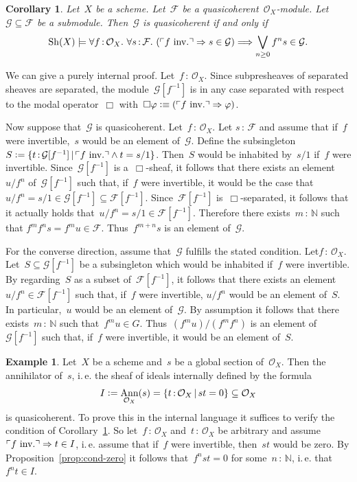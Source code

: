 \documentclass[10pt,reqno,a4paper]{amsbook}
\makeatletter
\theoremstyle{definition}
\newtheorem{ex}[defn]{Example}
\theoremstyle{plain}
\newtheorem{cor}[defn]{Corollary}
\theoremstyle{remark}
\newcommand{\F}{\mathcal{F}}
\renewcommand{\G}{\mathcal{G}}
\renewcommand{\O}{\mathcal{O}}
\newcommand{\NN}{\mathbb{N}}
\newcommand{\Sh}{\mathrm{Sh}}
\DeclareMathOperator{\Ann}{Ann}
\newcommand{\?}{\,{:}\,}
\renewcommand{\_}{\mathpunct{.}\,}
\newcommand{\speak}[1]{\ulcorner\text{\textnormal{#1}}\urcorner}
\newcommand{\ie}{i.\,e.\@\xspace}
\newcommand{\inv}{inv.\@}
\newcommand{\defeq}{\vcentcolon=}
\newcommand{\defequiv}{\vcentcolon\equiv}
\renewenvironment{proof}[1][\proofname]{\par
  \pushQED{\qed}%
  \normalfont \topsep6\p@\@plus6\p@\relax
  \trivlist
  \item[\hskip\labelsep
        \itshape
    #1\@addpunct{.}]\ignorespaces
}{%
  \popQED\endtrivlist\@endpefalse
}
\makeatother
\begin{document}
\begin{cor}\label{cor:submodule-qcoh}
Let~$X$ be a scheme. Let~$\F$ be a quasicoherent~$\O_X$-module.
Let~$\G \subseteq \F$ be a submodule. Then~$\G$ is quasicoherent if and only
if
\[ \Sh(X) \models \forall f\?\O_X\_
  \forall s\?\F\_
  (\speak{$f$ \inv} \Rightarrow s \in \G) \Longrightarrow
  \bigvee_{n \geq 0} f^n s \in \G. \]
\end{cor}
\begin{proof}We can give a purely internal proof. Let~$f\?\O_X$.
Since subpresheaves of separated sheaves are separated, the module~$\G[f^{-1}]$
is in any case separated with respect to the modal operator~$\Box$
with~$\Box\varphi \defequiv (\speak{$f$ \inv} \Rightarrow \varphi)$.

Now suppose that~$\G$ is quasicoherent. Let~$f\?\O_X$. Let $s\?\F$ and assume that
if~$f$ were invertible,~$s$ would be an element of~$\G$. Define the
subsingleton~$S \defeq \{ t\?\G[f^{-1}] \,|\, \speak{$f$ \inv} \wedge t=s/1 \}$.
Then~$S$ would be inhabited by~$s/1$ if~$f$ were invertible. Since~$\G[f^{-1}]$
is a~$\Box$-sheaf, it follows that there exists an element~$u/f^n$ of~$\G[f^{-1}]$
such that, if~$f$ were invertible, it would be the case that~$u/f^n = s/1 \in
\G[f^{-1}] \subseteq \F[f^{-1}]$.
Since~$\F[f^{-1}]$ is~$\Box$-separated, it follows that it actually holds that~$u/f^n
= s/1 \in \F[f^{-1}]$. Therefore there exists~$m\?\NN$ such that $f^m f^n s =
f^m u \in \F$. Thus~$f^{m+n} s$ is an element of~$\G$.

For the converse direction, assume that~$\G$ fulfills the stated condition.
Let$f\?\O_X$. Let~$S \subseteq \G[f^{-1}]$ be a subsingleton which would be
inhabited if~$f$ were invertible. By regarding~$S$ as a subset of~$\F[f^{-1}]$,
it follows that there exists an element~$u/f^n \in \F[f^{-1}]$ such that,
if~$f$ were invertible, $u/f^n$ would be an element of~$S$. In particular,~$u$
would be an element of~$\G$. By assumption
it follows that there exists~$m\?\NN$ such that~$f^m u \in G$. Thus~$(f^m u) /
(f^m f^n)$ is an element of~$\G[f^{-1}]$ such that, if~$f$ were invertible, it
would be an element of~$S$.
\end{proof}

\begin{ex}\label{ex:annihilator-qcoh}
Let~$X$ be a scheme and~$s$ be a global section of~$\O_X$. Then the
annihilator of~$s$, \ie the sheaf of ideals internally defined by the
formula
\[ I \defeq \Ann_{\O_X}(s) = \{ t\?\O_X \,|\, st = 0 \} \subseteq \O_X \]
is quasicoherent. To prove this in the internal language it suffices to
verify the condition of Corollary~\ref{cor:submodule-qcoh}.
So let~$f\?\O_X$ and~$t\?\O_X$ be arbitrary and assume~$\speak{$f$ \inv} \Rightarrow t \in I$,
\ie assume that if~$f$ were invertible, then~$st$ would be zero. By
Proposition~\ref{prop:cond-zero} it follows that~$f^n st = 0$ for
some~$n\?\NN$, \ie that~$f^n t \in I$.
\end{ex}
\end{document}
